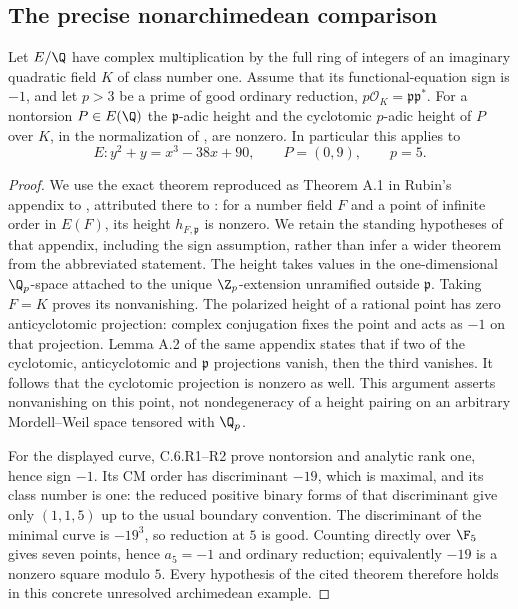 \subsection{The precise nonarchimedean comparison}
\begin{proposition}\label{ari:C.7.8}
Let $E/\Q$ have complex multiplication by the full ring of integers
of an imaginary quadratic field $K$ of class number one. Assume
that its functional-equation sign is $-1$, and let $p>3$ be a
prime of good ordinary reduction, $p\mathcal O_K=\mathfrak p
\mathfrak p^*$. For a nontorsion $P\in E(\Q)$ the
$\mathfrak p$-adic height and the cyclotomic $p$-adic height
of $P$ over $K$, in the normalization of
\citet[Appendix A]{agboola2006}, are nonzero.
In particular this applies to
\[
 E:y^2+y=x^3-38x+90,\qquad P=(0,9),\qquad p=5.
\]
\end{proposition}
\begin{proof}
We use the exact theorem reproduced as Theorem A.1 in Rubin's
appendix to \citet{agboola2006}, attributed there to
\citet{bertrand1984}: for a number field $F$ and a point of
infinite order in $E(F)$, its height $h_{F,\mathfrak p}$ is
nonzero. We retain the standing hypotheses of that appendix,
including the sign assumption, rather than infer a wider theorem
from the abbreviated statement. The height takes values in
the one-dimensional $\Q_p$-space attached to the unique
$\Z_p$-extension unramified outside $\mathfrak p$.
Taking $F=K$ proves its nonvanishing. The polarized height of
a rational point has zero anticyclotomic projection: complex
conjugation fixes the point and acts as $-1$ on that projection.
Lemma A.2 of the same appendix states that if two of the
cyclotomic, anticyclotomic and $\mathfrak p$ projections
vanish, then the third vanishes. It follows that the cyclotomic
projection is nonzero as well. This argument asserts nonvanishing
on this point, not nondegeneracy of a height pairing on an
arbitrary Mordell--Weil space tensored with $\Q_p$.

For the displayed curve, C.6.R1--R2 prove nontorsion and
analytic rank one, hence sign $-1$. Its CM order has
discriminant $-19$, which is maximal, and its class number is
one: the reduced positive binary forms of that discriminant
give only $(1,1,5)$ up to the usual boundary convention.
The discriminant of the minimal curve is $-19^3$, so reduction
at $5$ is good. Counting directly over $\F_5$ gives seven
points, hence $a_5=-1$ and ordinary reduction; equivalently
$-19$ is a nonzero square modulo $5$. Every hypothesis of the
cited theorem therefore holds in this concrete unresolved
archimedean example.
\end{proof}

